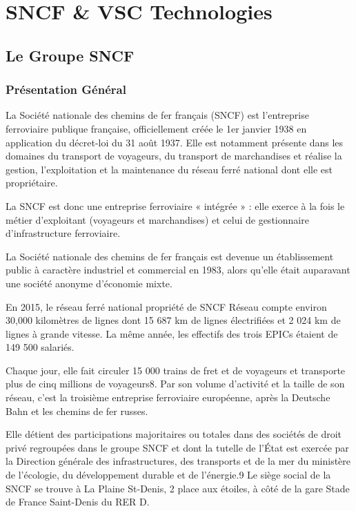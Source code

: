 \section{SNCF \& VSC Technologies}
\subsection{Le Groupe SNCF}

\subsubsection{Présentation Général}
La Société nationale des chemins de fer français (SNCF) est l'entreprise ferroviaire publique française, officiellement créée le 1er janvier 1938 en application du décret-loi du 31 août 1937.
Elle est notamment présente dans les domaines du transport de voyageurs, du transport de marchandises et réalise la gestion, l'exploitation et la maintenance du réseau ferré national dont elle est propriétaire.

La SNCF est donc une entreprise ferroviaire « intégrée » : elle exerce à la fois le métier d'exploitant (voyageurs et marchandises) et celui de gestionnaire d'infrastructure ferroviaire.

La Société nationale des chemins de fer français est devenue un établissement public à caractère industriel et commercial en 1983, alors qu'elle était auparavant une société anonyme d'économie mixte.

En 2015, le réseau ferré national propriété de SNCF Réseau compte environ 30,000 kilomètres de lignes dont 15 687 km de lignes électrifiées et 2 024 km de lignes à grande vitesse. La même année, les effectifs des trois EPICs étaient de 149 500 salariés.

Chaque jour, elle fait circuler 15 000 trains de fret et de voyageurs et transporte plus de cinq millions de voyageurs8. Par son volume d'activité et la taille de son réseau, c'est la troisième entreprise ferroviaire européenne, après la Deutsche Bahn et les chemins de fer russes.

Elle détient des participations majoritaires ou totales dans des sociétés de droit privé regroupées dans le groupe SNCF et dont la tutelle de l'État est exercée par la Direction générale des infrastructures, des transports et de la mer du ministère de l'écologie, du développement durable et de l'énergie.9 Le siège social de la SNCF se trouve à La Plaine St-Denis, 2 place aux étoiles, à côté de la gare Stade de France Saint-Denis du RER D.

